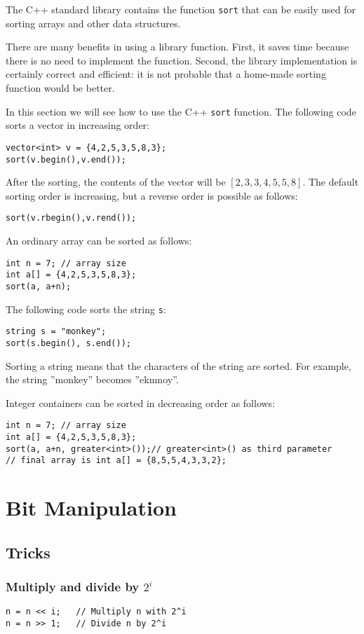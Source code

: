 \documentclass[twoside,12pt,a4paper,english]{book}
\theoremstyle{definition}
\theoremstyle{problemstyle}
\theoremstyle{problemstyle}
\theoremstyle{problemstyle}
\begin{document}
The C++ standard library contains
the function \texttt{sort} that can be easily used for
sorting arrays and other data structures.

There are many benefits in using a library function.
First, it saves time because there is no need to
implement the function.
Second, the library implementation is
certainly correct and efficient: it is not probable
that a home-made sorting function would be better.

In this section we will see how to use the
C++ \texttt{sort} function.
The following code sorts
a vector in increasing order:
\begin{lstlisting}
vector<int> v = {4,2,5,3,5,8,3};
sort(v.begin(),v.end());
\end{lstlisting}
After the sorting, the contents of the
vector will be
$[2,3,3,4,5,5,8]$.
The default sorting order is increasing,
but a reverse order is possible as follows:
\begin{lstlisting}
sort(v.rbegin(),v.rend());
\end{lstlisting}
An ordinary array can be sorted as follows:
\begin{lstlisting}
int n = 7; // array size
int a[] = {4,2,5,3,5,8,3};
sort(a, a+n);
\end{lstlisting}
The following code sorts the string \texttt{s}:
\begin{lstlisting}
string s = "monkey";
sort(s.begin(), s.end());
\end{lstlisting}
Sorting a string means that the characters
of the string are sorted.
For example, the string ''monkey'' becomes ''ekmnoy''.

Integer containers can be sorted in decreasing order as follows:

\begin{lstlisting}
int n = 7; // array size
int a[] = {4,2,5,3,5,8,3};
sort(a, a+n, greater<int>());// greater<int>() as third parameter
// final array is int a[] = {8,5,5,4,3,3,2};
\end{lstlisting}


\chapter{Bit Manipulation}
\section{Tricks}
\subsection{Multiply and divide by \texorpdfstring{$2^i$}{2**i}}
\begin{lstlisting}
n = n << i;   // Multiply n with 2^i
n = n >> 1;   // Divide n by 2^i
\end{lstlisting}
\end{document}
